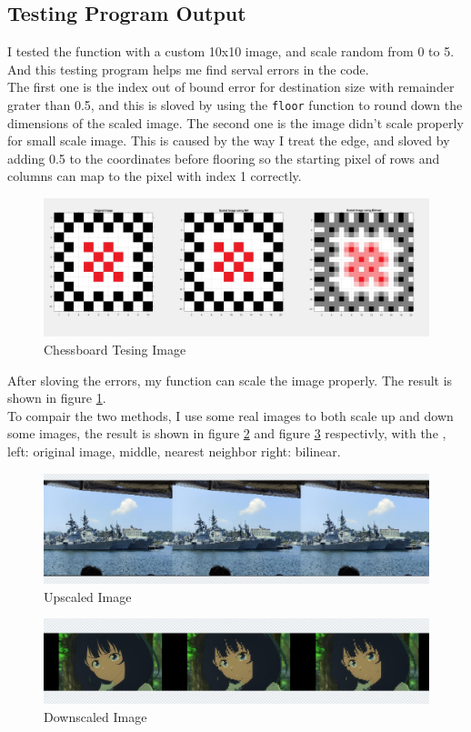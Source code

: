 \documentclass[a4paper,11pt]{article}
\begin{document}
\subsection{Testing Program Output}
I tested the function with a custom 10x10 image, and scale random from 0 to 5. And this testing program helps me find serval errors in the code. \\
The first one is the index out of bound error for destination size with remainder grater than 0.5, and this is sloved by using the \texttt{floor} function to round down the dimensions of the scaled image. The second one is the image didn't scale properly for small scale image. This is caused by the way I treat the edge, and sloved by adding 0.5 to the coordinates before flooring so the starting pixel of rows and columns can map to the pixel with index 1 correctly.\\

\begin{figure}[H]
    \centering
    \includegraphics[width=0.8\linewidth]{FinalResult.jpg}
    \caption{Chessboard Tesing Image}
    \label{pic:Demo_1}
\end{figure}
After sloving the errors, my function can scale the image properly. The result is shown in figure \ref{pic:Demo_1}.\\

To compair the two methods, I use some real images to both scale up and down some images, the result is shown in figure \ref{pic:Demo_2} and figure \ref{pic:Demo_3} respectivly, with the , left: original image, middle, nearest neighbor right: bilinear.\\

\begin{figure}[H]
    \centering
    \includegraphics[width=0.8\linewidth]{DemoUp.jpg}
    \caption{Upscaled Image}
    \label{pic:Demo_2}
\end{figure}
\begin{figure}[H]
    \centering
    \includegraphics[width=0.8\linewidth]{DemoDown.jpg}
    \caption{Downscaled Image}
    \label{pic:Demo_3}
\end{figure}
\end{document}
